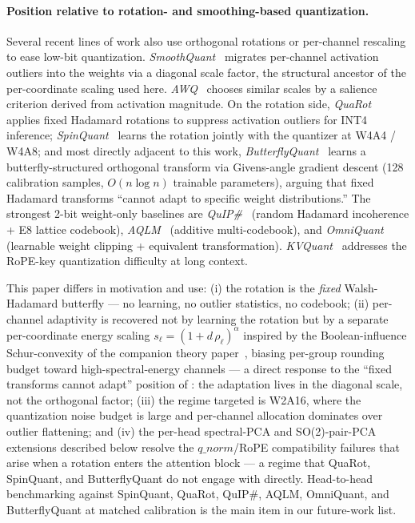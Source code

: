 \documentclass[11pt]{article}
\begin{document}
\paragraph{Position relative to rotation- and smoothing-based quantization.}
Several recent lines of work also use orthogonal rotations or per-channel rescaling to ease low-bit quantization. \emph{SmoothQuant}~\cite{xiao2023smoothquant} migrates per-channel activation outliers into the weights via a diagonal scale factor, the structural ancestor of the per-coordinate scaling used here. \emph{AWQ}~\cite{lin2024awq} chooses similar scales by a salience criterion derived from activation magnitude. On the rotation side, \emph{QuaRot}~\cite{ashkboos2024quarot} applies fixed Hadamard rotations to suppress activation outliers for INT4 inference; \emph{SpinQuant}~\cite{liu2024spinquant} learns the rotation jointly with the quantizer at W4A4 / W4A8; and most directly adjacent to this work, \emph{ButterflyQuant}~\cite{xu2025butterflyquant} learns a butterfly-structured orthogonal transform via Givens-angle gradient descent (128 calibration samples, $O(n \log n)$ trainable parameters), arguing that fixed Hadamard transforms ``cannot adapt to specific weight distributions.'' The strongest 2-bit weight-only baselines are \emph{QuIP\#}~\cite{tseng2024quipsharp} (random Hadamard incoherence + E8 lattice codebook), \emph{AQLM}~\cite{egiazarian2024aqlm} (additive multi-codebook), and \emph{OmniQuant}~\cite{shao2024omniquant} (learnable weight clipping + equivalent transformation). \emph{KVQuant}~\cite{hooper2024kvquant} addresses the RoPE-key quantization difficulty at long context.

This paper differs in motivation and use: (i) the rotation is the \emph{fixed} Walsh-Hadamard butterfly --- no learning, no outlier statistics, no codebook; (ii) per-channel adaptivity is recovered not by learning the rotation but by a separate per-coordinate energy scaling $s_\ell = (1+d\,\rho_\ell)^\alpha$ inspired by the Boolean-influence Schur-convexity of the companion theory paper~\cite{bbtTheoryCompanion}, biasing per-group rounding budget toward high-spectral-energy channels --- a direct response to the ``fixed transforms cannot adapt'' position of \cite{xu2025butterflyquant}: the adaptation lives in the diagonal scale, not the orthogonal factor; (iii) the regime targeted is W2A16, where the quantization noise budget is large and per-channel allocation dominates over outlier flattening; and (iv) the per-head spectral-PCA and SO(2)-pair-PCA extensions described below resolve the $q\_norm$/RoPE compatibility failures that arise when a rotation enters the attention block --- a regime that QuaRot, SpinQuant, and ButterflyQuant do not engage with directly. Head-to-head benchmarking against SpinQuant, QuaRot, QuIP\#, AQLM, OmniQuant, and ButterflyQuant at matched calibration is the main item in our future-work list.
\end{document}
